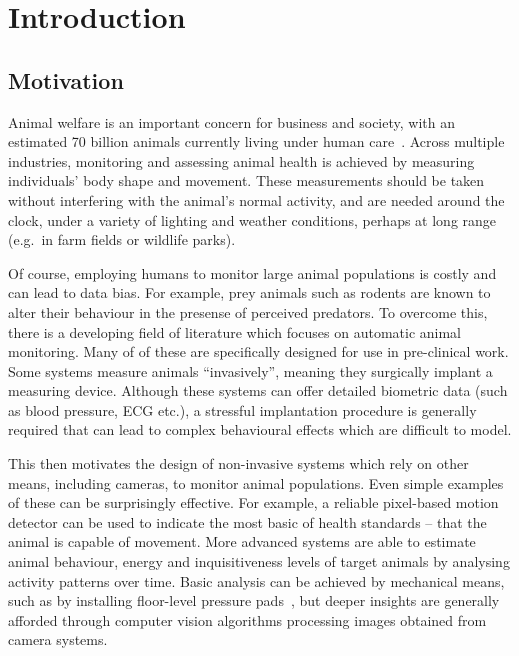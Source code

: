 
\chapter{Introduction}\label{chap:intro}  %

\ifpdf
    \graphicspath{{Chapter1/Figs/Raster/}{Chapter1/Figs/PDF/}{Chapter1/Figs/}}
\else
    \graphicspath{{Chapter1/Figs/Vector/}{Chapter1/Figs/}}
\fi


\section{Motivation} %

Animal welfare is an important concern for business and society, with an estimated 70 billion animals currently living under human care~\cite{FAOSTAT}. Across multiple industries, monitoring and assessing animal health is achieved by measuring individuals' body shape and movement. These measurements should be taken without interfering with the animal's normal activity, and are needed around the clock, under a variety of lighting and weather conditions, perhaps at long range (e.g.\ in farm fields or wildlife parks). 

Of course, employing humans to monitor large animal populations is costly and can lead to data bias. For example, prey animals such as rodents are known to alter their behaviour in the presense of perceived predators. To overcome this, there is a developing field of literature which focuses on automatic animal monitoring. Many of of these are specifically designed for use in pre-clinical work. Some systems measure animals ``invasively'', meaning they surgically implant a measuring device. Although these systems can offer detailed biometric data (such as blood pressure, ECG etc.), a stressful implantation procedure is generally required that can lead to complex behavioural effects which are difficult to model.

This then motivates the design of non-invasive systems which rely on other means, including cameras, to monitor animal populations. Even simple examples of these can be surprisingly effective. For example, a reliable pixel-based motion detector can be used to indicate the most basic of health standards -- that the animal is capable of movement. More advanced systems are able to estimate animal behaviour, energy and inquisitiveness levels of target animals by analysing activity patterns over time. Basic analysis can be achieved by mechanical means, such as by installing floor-level pressure pads~\cite{zammit2010reliability}, but deeper insights are generally afforded through computer vision algorithms processing images obtained from camera systems.

